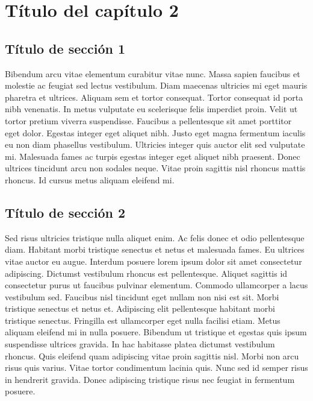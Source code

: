
\pagestyle{myportland}
\doublespacing
\chapter[----- Título del capítulo 2]{Título del capítulo 2}
\thispagestyle{myportland}

\section{Título de sección 1}

Bibendum arcu vitae elementum curabitur vitae nunc. Massa sapien faucibus et molestie ac feugiat sed lectus vestibulum. Diam maecenas ultricies mi eget mauris pharetra et ultrices. Aliquam sem et tortor consequat. Tortor consequat id porta nibh venenatis. In metus vulputate eu scelerisque felis imperdiet proin. Velit ut tortor pretium viverra suspendisse. Faucibus a pellentesque sit amet porttitor eget dolor. Egestas integer eget aliquet nibh. Justo eget magna fermentum iaculis eu non diam phasellus vestibulum. Ultricies integer quis auctor elit sed vulputate mi. Malesuada fames ac turpis egestas integer eget aliquet nibh praesent. Donec ultrices tincidunt arcu non sodales neque. Vitae proin sagittis nisl rhoncus mattis rhoncus. Id cursus metus aliquam eleifend mi.

\section{Título de sección 2}

Sed risus ultricies tristique nulla aliquet enim. Ac felis donec et odio pellentesque diam. Habitant morbi tristique senectus et netus et malesuada fames. Eu ultrices vitae auctor eu augue. Interdum posuere lorem ipsum dolor sit amet consectetur adipiscing. Dictumst vestibulum rhoncus est pellentesque. Aliquet sagittis id consectetur purus ut faucibus pulvinar elementum. Commodo ullamcorper a lacus vestibulum sed. Faucibus nisl tincidunt eget nullam non nisi est sit. Morbi tristique senectus et netus et. Adipiscing elit pellentesque habitant morbi tristique senectus. Fringilla est ullamcorper eget nulla facilisi etiam. Metus aliquam eleifend mi in nulla posuere. Bibendum ut tristique et egestas quis ipsum suspendisse ultrices gravida. In hac habitasse platea dictumst vestibulum rhoncus. Quis eleifend quam adipiscing vitae proin sagittis nisl. Morbi non arcu risus quis varius. Vitae tortor condimentum lacinia quis. Nunc sed id semper risus in hendrerit gravida. Donec adipiscing tristique risus nec feugiat in fermentum posuere.


